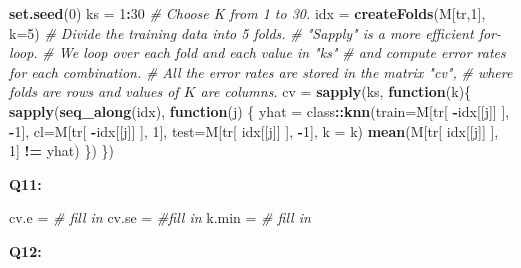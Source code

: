 \documentclass[]{article}
\newenvironment{Shaded}{\begin{snugshade}}{\end{snugshade}}
\newcommand{\KeywordTok}[1]{\textcolor[rgb]{0.13,0.29,0.53}{\textbf{#1}}}
\newcommand{\DataTypeTok}[1]{\textcolor[rgb]{0.13,0.29,0.53}{#1}}
\newcommand{\DecValTok}[1]{\textcolor[rgb]{0.00,0.00,0.81}{#1}}
\newcommand{\StringTok}[1]{\textcolor[rgb]{0.31,0.60,0.02}{#1}}
\newcommand{\CommentTok}[1]{\textcolor[rgb]{0.56,0.35,0.01}{\textit{#1}}}
\newcommand{\ControlFlowTok}[1]{\textcolor[rgb]{0.13,0.29,0.53}{\textbf{#1}}}
\newcommand{\OperatorTok}[1]{\textcolor[rgb]{0.81,0.36,0.00}{\textbf{#1}}}
\newcommand{\NormalTok}[1]{#1}
\begin{document}
\begin{Shaded}
\begin{Highlighting}[]
\KeywordTok{set.seed}\NormalTok{(}\DecValTok{0}\NormalTok{)}
\NormalTok{ks =}\StringTok{ }\DecValTok{1}\OperatorTok{:}\DecValTok{30} \CommentTok{# Choose K from 1 to 30.}
\NormalTok{idx =}\StringTok{ }\KeywordTok{createFolds}\NormalTok{(M[tr,}\DecValTok{1}\NormalTok{], }\DataTypeTok{k=}\DecValTok{5}\NormalTok{) }\CommentTok{# Divide the training data into 5 folds.}
\CommentTok{# "Sapply" is a more efficient for-loop. }
\CommentTok{# We loop over each fold and each value in "ks"}
\CommentTok{# and compute error rates for each combination.}
\CommentTok{# All the error rates are stored in the matrix "cv", }
\CommentTok{# where folds are rows and values of $K$ are columns.}
\NormalTok{cv =}\StringTok{ }\KeywordTok{sapply}\NormalTok{(ks, }\ControlFlowTok{function}\NormalTok{(k)\{ }
  \KeywordTok{sapply}\NormalTok{(}\KeywordTok{seq_along}\NormalTok{(idx), }\ControlFlowTok{function}\NormalTok{(j) \{}
\NormalTok{    yhat =}\StringTok{ }\NormalTok{class}\OperatorTok{::}\KeywordTok{knn}\NormalTok{(}\DataTypeTok{train=}\NormalTok{M[tr[ }\OperatorTok{-}\NormalTok{idx[[j]] ], }\OperatorTok{-}\DecValTok{1}\NormalTok{],}
               \DataTypeTok{cl=}\NormalTok{M[tr[ }\OperatorTok{-}\NormalTok{idx[[j]] ], }\DecValTok{1}\NormalTok{],}
               \DataTypeTok{test=}\NormalTok{M[tr[ idx[[j]] ], }\OperatorTok{-}\DecValTok{1}\NormalTok{], }\DataTypeTok{k =}\NormalTok{ k)}
    \KeywordTok{mean}\NormalTok{(M[tr[ idx[[j]] ], }\DecValTok{1}\NormalTok{] }\OperatorTok{!=}\StringTok{ }\NormalTok{yhat)}
\NormalTok{  \})}
\NormalTok{\})}
\end{Highlighting}
\end{Shaded}

\textbf{Q11:}

\begin{Shaded}
\begin{Highlighting}[]
\NormalTok{cv.e =}\StringTok{ }\CommentTok{# fill in}
\NormalTok{cv.se =}\StringTok{ }\CommentTok{#fill in}
\NormalTok{k.min =}\StringTok{ }\CommentTok{# fill in}
\end{Highlighting}
\end{Shaded}

\textbf{Q12:}
\end{document}
